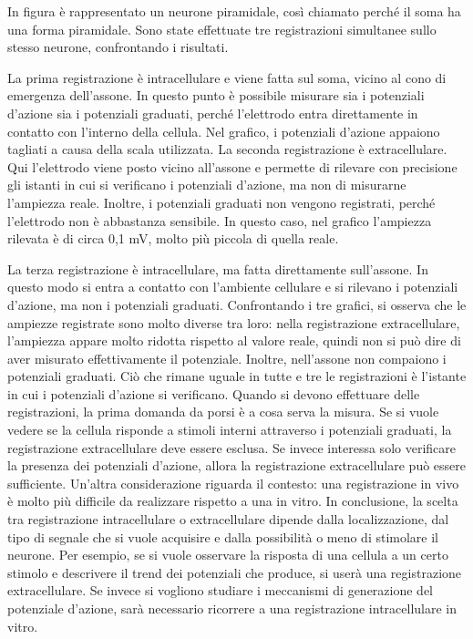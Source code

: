\documentclass[12pt,a4paper]{book}
\begin{document}
In figura è rappresentato un neurone piramidale, così chiamato perché il soma ha una forma piramidale. Sono state effettuate tre registrazioni simultanee sullo stesso neurone, confrontando i risultati.

La prima registrazione è intracellulare e viene fatta sul soma, vicino al cono di emergenza dell'assone. In questo punto è possibile misurare sia i potenziali d'azione sia i potenziali graduati, perché l'elettrodo entra direttamente in contatto con l'interno della cellula. Nel grafico, i potenziali d'azione appaiono tagliati a causa della scala utilizzata. La seconda registrazione è extracellulare. Qui l'elettrodo viene posto vicino all'assone e permette di rilevare con precisione gli istanti in cui si verificano i potenziali d'azione, ma non di misurarne l'ampiezza reale. Inoltre, i potenziali graduati non vengono registrati, perché l'elettrodo non è abbastanza sensibile. In questo caso, nel grafico l'ampiezza rilevata è di circa 0,1 mV, molto più piccola di quella reale.

La terza registrazione è intracellulare, ma fatta direttamente sull'assone. In questo modo si entra a contatto con l'ambiente cellulare e si rilevano i potenziali d'azione, ma non i potenziali graduati. Confrontando i tre grafici, si osserva che le ampiezze registrate sono molto diverse tra loro: nella registrazione extracellulare, l'ampiezza appare molto ridotta rispetto al valore reale, quindi non si può dire di aver misurato eﬀettivamente il potenziale. Inoltre, nell'assone non compaiono i potenziali graduati. Ciò che rimane uguale in tutte e tre le registrazioni è l'istante in cui i potenziali d'azione si verificano. Quando si devono eﬀettuare delle registrazioni, la prima domanda da porsi è a cosa serva la misura. Se si vuole vedere se la cellula risponde a stimoli interni attraverso i potenziali graduati, la registrazione extracellulare deve essere esclusa. Se invece interessa solo verificare la presenza dei potenziali d'azione, allora la registrazione extracellulare può essere suﬃciente. Un'altra considerazione riguarda il contesto: una registrazione in vivo è molto più diﬃcile da realizzare rispetto a una in vitro. In conclusione, la scelta tra registrazione intracellulare o extracellulare dipende dalla localizzazione, dal tipo di segnale che si vuole acquisire e dalla possibilità o meno di stimolare il neurone. Per esempio, se si vuole osservare la risposta di una cellula a un certo stimolo e descrivere il trend dei potenziali che produce, si userà una registrazione extracellulare. Se invece si vogliono studiare i meccanismi di generazione del potenziale d'azione, sarà necessario ricorrere a una registrazione intracellulare in vitro.
\end{document}
